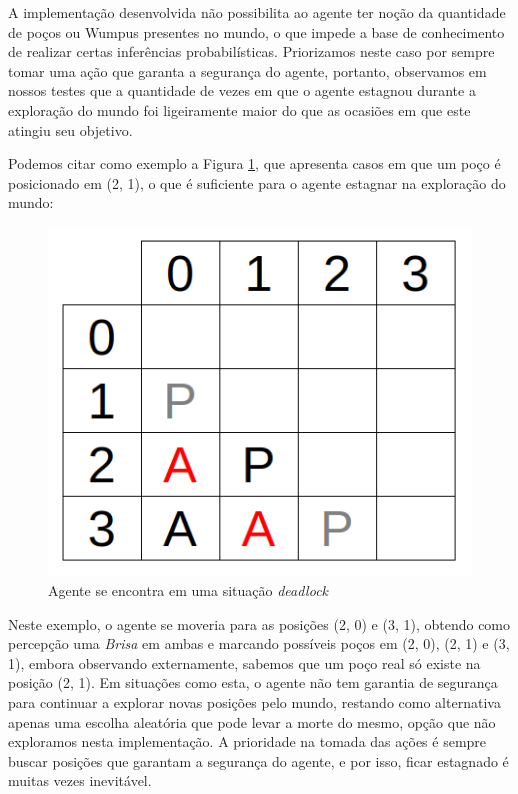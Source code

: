 \documentclass[a4paper, 12pt]{article}
\begin{document}
A implementação desenvolvida não possibilita ao agente ter noção da quantidade de poços ou Wumpus presentes no mundo, o que impede a base de conhecimento de realizar certas inferências probabilísticas. Priorizamos neste caso por sempre tomar uma ação que garanta a segurança do agente, portanto, observamos em nossos testes que a quantidade de vezes em que o agente estagnou durante a exploração do mundo foi ligeiramente maior do que as ocasiões em que este atingiu seu objetivo.

Podemos citar como exemplo a Figura \ref{fig:Figure2}, que apresenta casos em que um poço é posicionado em  (2, 1), o que é suficiente para o agente estagnar na exploração do mundo:

\begin{figure}[H]
    \centering
    \includegraphics[scale=0.5]{deadlock.png}
    \caption{Agente se encontra em uma situação \emph{deadlock}}
    \label{fig:Figure2}
\end{figure}

Neste exemplo, o agente se moveria para as posições (2, 0) e (3, 1), obtendo como percepção uma \emph{Brisa} em ambas e marcando possíveis poços em (2, 0), (2, 1) e (3, 1), embora observando externamente, sabemos que um poço real só existe na posição (2, 1). Em situações como esta, o agente não tem garantia de segurança para continuar a explorar novas posições pelo mundo, restando como alternativa apenas uma escolha aleatória que pode levar a morte do mesmo, opção que não exploramos nesta implementação. A prioridade na tomada das ações é sempre buscar posições que garantam a segurança do agente, e por isso, ficar estagnado é muitas vezes inevitável.
\end{document}
